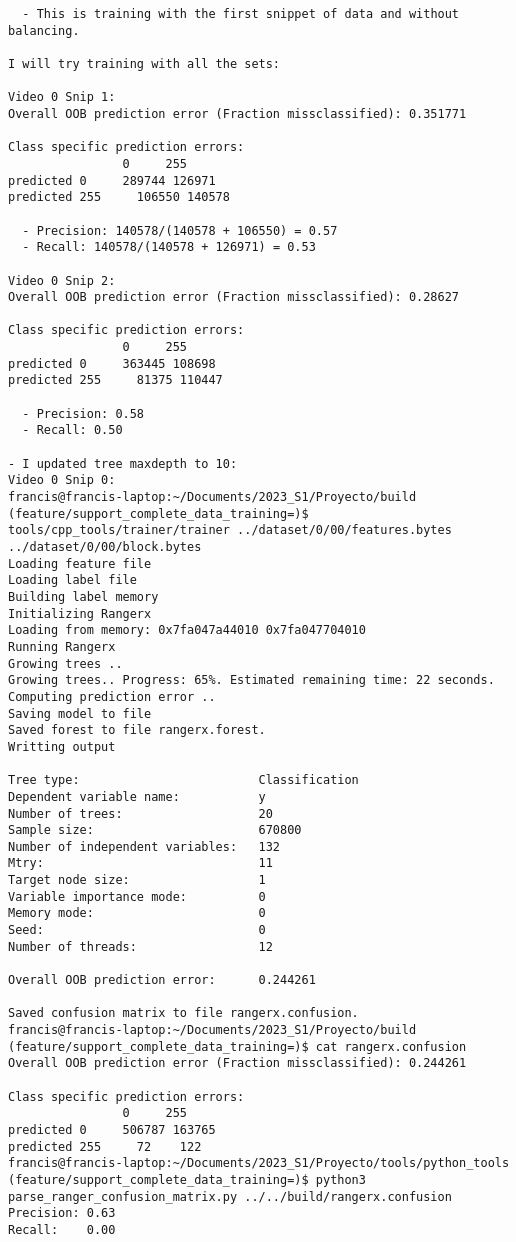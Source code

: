 \documentclass[12pt,oneside]{book}
\begin{document}
\begin{lstlisting}
  - This is training with the first snippet of data and without balancing.

I will try training with all the sets:

Video 0 Snip 1:
Overall OOB prediction error (Fraction missclassified): 0.351771

Class specific prediction errors:
                0     255
predicted 0     289744 126971 
predicted 255     106550 140578 

  - Precision: 140578/(140578 + 106550) = 0.57
  - Recall: 140578/(140578 + 126971) = 0.53

Video 0 Snip 2:
Overall OOB prediction error (Fraction missclassified): 0.28627

Class specific prediction errors:
                0     255
predicted 0     363445 108698 
predicted 255     81375 110447

  - Precision: 0.58
  - Recall: 0.50

- I updated tree maxdepth to 10:
Video 0 Snip 0:
francis@francis-laptop:~/Documents/2023_S1/Proyecto/build (feature/support_complete_data_training=)$ tools/cpp_tools/trainer/trainer ../dataset/0/00/features.bytes ../dataset/0/00/block.bytes 
Loading feature file
Loading label file
Building label memory
Initializing Rangerx
Loading from memory: 0x7fa047a44010 0x7fa047704010
Running Rangerx
Growing trees ..
Growing trees.. Progress: 65%. Estimated remaining time: 22 seconds.
Computing prediction error ..
Saving model to file
Saved forest to file rangerx.forest.
Writting output

Tree type:                         Classification
Dependent variable name:           y
Number of trees:                   20
Sample size:                       670800
Number of independent variables:   132
Mtry:                              11
Target node size:                  1
Variable importance mode:          0
Memory mode:                       0
Seed:                              0
Number of threads:                 12

Overall OOB prediction error:      0.244261

Saved confusion matrix to file rangerx.confusion.
francis@francis-laptop:~/Documents/2023_S1/Proyecto/build (feature/support_complete_data_training=)$ cat rangerx.confusion 
Overall OOB prediction error (Fraction missclassified): 0.244261

Class specific prediction errors:
                0     255
predicted 0     506787 163765 
predicted 255     72    122   
francis@francis-laptop:~/Documents/2023_S1/Proyecto/tools/python_tools (feature/support_complete_data_training=)$ python3 parse_ranger_confusion_matrix.py ../../build/rangerx.confusion 
Precision: 0.63
Recall:    0.00


\end{lstlisting}
\end{document}
